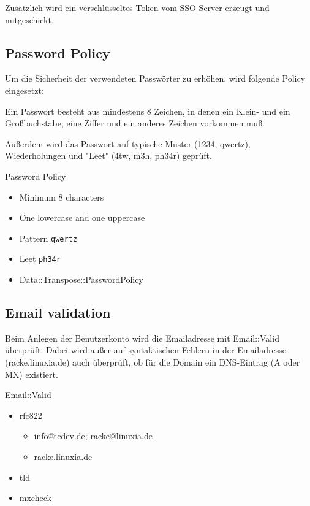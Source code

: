 Zusätzlich wird ein verschlüsseltes Token vom SSO-Server
erzeugt und mitgeschickt.                       
                       
\subsection{Password Policy}

Um die Sicherheit der verwendeten Passwörter zu erhöhen, wird
folgende Policy eingesetzt:

Ein Passwort besteht aus mindestens 8 Zeichen, in denen
ein Klein- und ein Großbuchstabe, eine Ziffer und ein
anderes Zeichen vorkommen muß.

Außerdem wird das Passwort auf typische Muster (1234, qwertz),
Wiederholungen und "Leet" (4tw, m3h, ph34r) geprüft.

\begin{frame}[fragile]{Password Policy}
\begin{itemize}
\item Minimum 8 characters
\item One lowercase and one uppercase
\item Pattern \verb|qwertz|
\item Leet \verb|ph34r|
\item Data::Transpose::PasswordPolicy
\end{itemize}
\end{frame}

\subsection{Email validation}

Beim Anlegen der Benutzerkonto wird die Emailadresse
mit Email::Valid überprüft. Dabei wird außer auf
syntaktischen Fehlern in der Emailadresse (racke.linuxia.de)
auch überprüft, ob für die Domain ein DNS-Eintrag (A oder MX)
existiert.    
                   
\begin{frame}{Email::Valid}
\begin{itemize}
\item rfc822
\begin{itemize}
\item info@icdev.de; racke@linuxia.de
\item racke.linuxia.de
\end{itemize}
\item tld
\item mxcheck
\end{itemize}
\end{frame}

